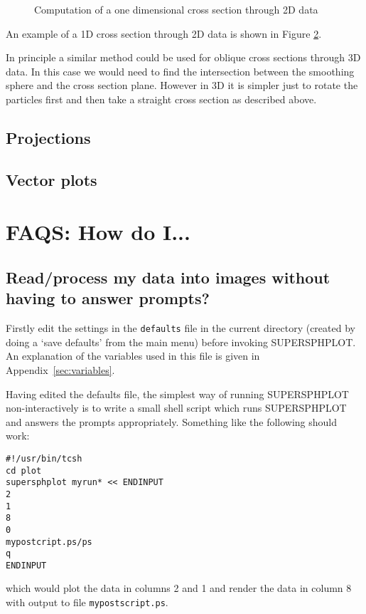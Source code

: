 \documentclass[a4paper,12pt]{article}
\begin{document}
\begin{figure}
\begin{center}
\caption{Computation of a one dimensional cross section through 2D data}
\label{fig:xsec2D}
\end{center}
\end{figure}
 
 An example of a 1D cross section through 2D data is shown in Figure
\ref{fig:xsec2Dexample}.
\begin{figure}
\begin{center}
\label{fig:xsec2Dexample}
\end{center}
\end{figure}

 In principle a similar method could be used for oblique cross sections
through 3D data. In this case we would need to find the intersection
between the smoothing sphere and the cross section plane. However
in 3D it is simpler just to rotate the particles first and then take
a straight cross section as described above.

\subsection{Projections}


\subsection{Vector plots}
 


\section{FAQS: How do I...}

\subsection{Read/process my data into images without having to answer prompts?}
 Firstly edit the settings in the \verb+defaults+ file in the current
directory (created by doing a `save defaults' from the main menu) before invoking SUPERSPHPLOT. An explanation of the variables used in this
file is given in Appendix~\ref{sec:variables}. 

 Having edited the defaults file, the simplest way of running SUPERSPHPLOT
non-interactively is to write a small shell script which runs SUPERSPHPLOT
and answers the prompts appropriately. Something like the following should work:
\begin{verbatim}
#!/usr/bin/tcsh
cd plot
supersphplot myrun* << ENDINPUT
2
1
8
0
mypostcript.ps/ps
q
ENDINPUT
\end{verbatim}
which would plot the data in columns 2 and 1 and render the data in column 8 with
output to file \verb+mypostscript.ps+.
\end{document}
